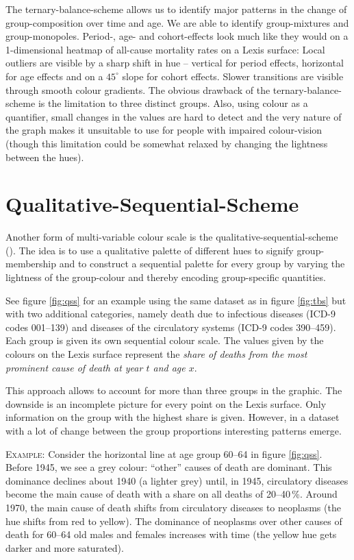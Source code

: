 \documentclass[a4paper]{scrartcl}
\begin{document}
The ternary-balance-scheme allows us to identify major patterns in the change of group-composition over time and age. We are able to identify group-mixtures and group-monopoles. Period-, age- and cohort-effects look much like they would on a 1-dimensional heatmap of all-cause mortality rates on a Lexis surface: Local outliers are visible by a sharp shift in hue -- vertical for period effects, horizontal for age effects and on a $45^{\circ}$ slope for cohort effects. Slower transitions are visible through smooth colour gradients.
The obvious drawback of the ternary-balance-scheme is the limitation to three distinct groups. Also, using colour as a quantifier, small changes in the values are hard to detect and the very nature of the graph makes it unsuitable to use for people with impaired colour-vision (though this limitation could be somewhat relaxed by changing the lightness between the hues).

\section*{Qualitative-Sequential-Scheme}

Another form of multi-variable colour scale is the qualitative-sequential-scheme (\cite{Brewer1994a}). The idea is to use a qualitative palette of different hues to signify group-membership and to construct a sequential palette for every group by varying the lightness of the group-colour and thereby encoding group-specific quantities.

See figure \ref{fig:qss} for an example using the same dataset as in figure \ref{fig:tbs} but with two additional categories, namely death due to infectious diseases (ICD-9 codes 001--139) and diseases of the circulatory systems (ICD-9 codes 390--459). Each group is given its own sequential colour scale. The values given by the colours on the Lexis surface represent the \emph{share of deaths from the most prominent cause of death at year $t$ and age $x$}.

This approach allows to account for more than three groups in the graphic. The downside is an incomplete picture for every point on the Lexis surface. Only information on the group with the highest share is given. However, in a dataset with a lot of change between the group proportions interesting patterns emerge.

\textsc{Example:} Consider the horizontal line at age group 60--64 in figure \ref{fig:qss}. Before 1945, we see a grey colour: \enquote{other} causes of death are dominant. This dominance declines about 1940 (a lighter grey) until, in 1945, circulatory diseases become the main cause of death with a share on all deaths of 20--40\,\%. Around 1970, the main cause of death shifts from circulatory diseases to neoplasms (the hue shifts from red to yellow). The dominance of neoplasms over other causes of death for 60--64 old males and females increases with time (the yellow hue gets darker and more saturated).
\end{document}
